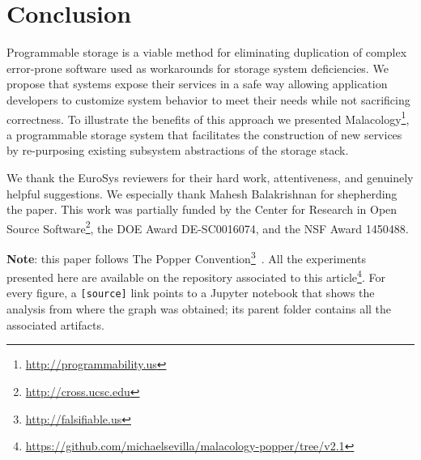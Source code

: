 \section{Conclusion}
\label{conclusion-and-future-work}

Programmable storage is a viable method for eliminating duplication of complex
error-prone software used as workarounds for storage system deficiencies. We
propose that systems expose their services in a safe way allowing application
developers to customize system behavior to meet their needs while not
sacrificing correctness. To illustrate the benefits of this approach we
presented Malacology\footnote{\url{http://programmability.us}}, a programmable
storage system that facilitates the construction of new services by
re-purposing existing subsystem abstractions of the storage stack. 


\acks

We thank the EuroSys reviewers for their hard work, attentiveness, and
genuinely helpful suggestions. We especially thank Mahesh Balakrishnan for
shepherding the paper. This work was partially funded by the Center for
Research in Open Source Software\footnote{\url{http://cross.ucsc.edu}}, the DOE
Award DE-SC0016074, and the NSF Award 1450488.

\textbf{Note}: this paper follows The Popper
Convention\footnote{\url{http://falsifiable.us}}~\cite{jimenez_popper_2016}.
All the experiments presented here are available on the repository associated
to this
article\footnote{\url{https://github.com/michaelsevilla/malacology-popper/tree/v2.1}}.
For every figure, a \texttt{[source]} link points to a Jupyter notebook that
shows the analysis from where the graph was obtained; its parent folder
contains all the associated artifacts.
